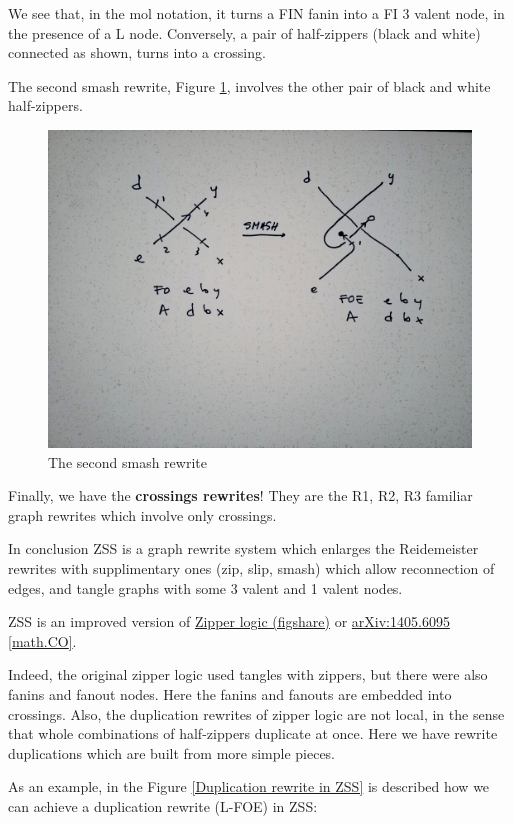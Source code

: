 \documentclass[]{article}
\begin{document}
We see that, in the mol notation, it turns a FIN fanin into a FI 3
valent node, in the presence of a L node. Conversely, a pair of
half-zippers (black and white) connected as shown, turns into a
crossing.

The second smash rewrite, Figure \ref{The-second-smash-rewrite}, involves the other pair of black and white
half-zippers.

\begin{figure}[h!]
\centering
\includegraphics[width=0.75\linewidth]{img/3843.jpg}
\caption{The second smash rewrite}
\label{The-second-smash-rewrite}
\end{figure}

Finally, we have the \textbf{crossings rewrites}! They are the R1, R2,
R3 familiar graph rewrites which involve only crossings.

In conclusion ZSS is a graph rewrite system which enlarges the
Reidemeister rewrites with supplimentary ones (zip, slip, smash) which
allow reconnection of edges, and tangle graphs with some 3 valent and 1
valent nodes.

ZSS is an improved version of \cite{buligazipper} 
\href{https://doi.org/10.6084/m9.figshare.1032660.v1}{Zipper logic
(figshare)} or \href{https://arxiv.org/abs/1405.6095}{arXiv:1405.6095
{[}math.CO{]}}.

Indeed, the original zipper logic used tangles with zippers, but there
were also fanins and fanout nodes. Here the fanins and fanouts are
embedded into crossings. Also, the duplication rewrites of zipper logic
are not local, in the sense that whole combinations of half-zippers
duplicate at once. Here we have rewrite duplications which are built
from more simple pieces.

As an example, in the Figure \ref{Duplication rewrite in ZSS} is described how we can achieve a duplication rewrite (L-FOE) in ZSS:
\end{document}
